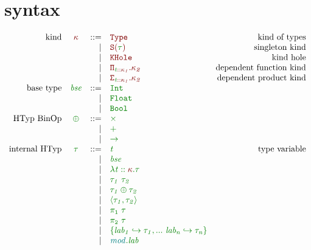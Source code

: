 \documentclass[12pt,fleqn]{article}
\newcommand{\red}[1]{\textcolor{red}{#1}}
\newcommand{\green}[1]{\textcolor{green}{#1}}
\newcommand{\teal}[1]{\textcolor{teal}{#1}}
\newcommand{\redtt}[1]{\red{\mathtt{#1}}}
\newcommand{\greentt}[1]{\green{\mathtt{#1}}}
\newcommand{\redit}[1]{\red{\mathit{#1}}}
\newcommand{\greenit}[1]{\green{\mathit{#1}}}
\newcommand{\tealit}[1]{\teal{\mathit{#1}}}
\newcommand{\knd}[1][]{\redit{\kappa#1}}
\newcommand{\typ}[1][]{\greenit{\tau#1}}
\newcommand{\typvar}[1][]{\greenit{t#1}}
\renewcommand{\mod}[1][]{\tealit{mod#1}}
\newcommand{\lab}[1][]{\mathit{lab#1}}
\newcommand{\Type}{\redtt{Type}}
\newcommand{\SKind}[1]{\redtt{S(#1)}}
\newcommand{\KHole}{\redtt{KHole}}
\newcommand{\DepFunKind}[2]{\redtt{\Pi_{#1}.{#2}}}
\newcommand{\DepProdKind}[2]{\redtt{\Sigma_{#1}.{#2}}}
\newcommand{\TypCFun}[2]{\greentt{\lambda #1.#2}}
\newcommand{\TypCAp}[2]{\greentt{#1~#2}}
\newcommand{\TypCPair}[2]{\greentt{\langle #1, #2\rangle}}
\newcommand{\TypCPairPrjL}[1]{\greentt{\pi_1~#1}}
\newcommand{\TypCPairPrjR}[1]{\greentt{\pi_2~#1}}
\newcommand{\Int}{\greentt{Int}}
\newcommand{\Float}{\greentt{Float}}
\newcommand{\Bool}{\greentt{Bool}}
\begin{document}
\section{syntax}
\[\begin{array}{rcrlr}
    \textrm{kind} & \knd & ::=
                  & \Type & \textrm{kind of types} \\
                  && \vert & \SKind{\typ} & \textrm{singleton kind} \\
                  && \vert & \KHole & \textrm{kind hole} \\
                  && \vert & \DepFunKind{\typvar::\knd[_1]}{\knd[_2]} & \textrm{dependent function kind} \\
                  && \vert & \DepProdKind{\typvar::\knd[_1]}{\knd[_2]} & \textrm{dependent product kind} \\
    \textrm{base type} & \greenit{bse} & ::=
                       & \Int \\
                       && \vert & \Float \\
                       && \vert & \Bool \\
    \textrm{HTyp BinOp} & \greenit{\oplus} & ::=
                   & \greentt{\times} \\
                   && \vert & \greentt{+} \\
                   && \vert & \greentt{\rightarrow}\\
    \textrm{internal HTyp} & \typ & ::=
                           & \typvar & \textrm{type variable} \\
                           && \vert & \greenit{bse} \\
                           && \vert & \TypCFun{\typvar::\knd}{\typ} \\
                           && \vert & \TypCAp{\typ[_1]}{\typ[_2]} \\
                           && \vert & \greentt{\typ[_1] \oplus \typ[_2]} \\
                           && \vert & \TypCPair{\typ[_1]}{\typ[_2]} \\
                           && \vert & \TypCPairPrjL{\typ} \\
                           && \vert & \TypCPairPrjR{\typ} \\
                           && \vert & \greentt{\{\lab[_1] \hookrightarrow \typ[_1], ...~\lab[_n] \hookrightarrow \typ[_n]\}} \\
                           && \vert & \greentt{\mod.\lab} \\

\end{array}\]
\end{document}
